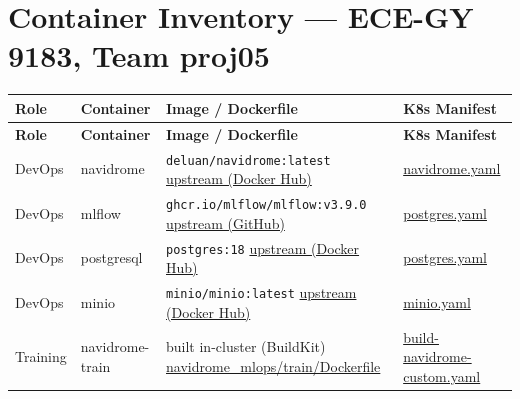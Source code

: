 \documentclass[11pt,a4paper]{article}
\begin{document}
\section*{Container Inventory --- ECE-GY 9183, Team proj05}

\footnotesize
\setlength{\tabcolsep}{5pt}

\begin{longtable}{@{} p{1.5cm} p{2.6cm} p{4.8cm} p{4.4cm} @{}}
\toprule
\textbf{Role} & \textbf{Container} & \textbf{Image / Dockerfile} & \textbf{K8s Manifest} \\
\midrule
\endfirsthead
\toprule
\textbf{Role} & \textbf{Container} & \textbf{Image / Dockerfile} & \textbf{K8s Manifest} \\
\midrule
\endhead
\bottomrule
\endlastfoot

DevOps &
navidrome &
\texttt{deluan/navidrome:latest} \newline
\href{https://hub.docker.com/r/deluan/navidrome}{upstream (Docker Hub)} &
\href{https://github.com/salawhaaat/navidrome-iac/blob/main/k8s/platform/templates/navidrome.yaml}{navidrome.yaml} \\[8pt]

DevOps &
mlflow &
\texttt{ghcr.io/mlflow/mlflow:v3.9.0} \newline
\href{https://github.com/mlflow/mlflow}{upstream (GitHub)} &
\href{https://github.com/salawhaaat/navidrome-iac/blob/main/k8s/platform/templates/postgres.yaml}{postgres.yaml} \\[8pt]

DevOps &
postgresql &
\texttt{postgres:18} \newline
\href{https://hub.docker.com/_/postgres}{upstream (Docker Hub)} &
\href{https://github.com/salawhaaat/navidrome-iac/blob/main/k8s/platform/templates/postgres.yaml}{postgres.yaml} \\[8pt]

DevOps &
minio &
\texttt{minio/minio:latest} \newline
\href{https://hub.docker.com/r/minio/minio}{upstream (Docker Hub)} &
\href{https://github.com/salawhaaat/navidrome-iac/blob/main/k8s/platform/templates/minio.yaml}{minio.yaml} \\[8pt]

Training &
navidrome-train &
built in-cluster (BuildKit) \newline
\href{https://github.com/yeshavyas27/navidrome_mlops/blob/master/train/Dockerfile}{navidrome\_mlops/train/Dockerfile} &
\href{https://github.com/salawhaaat/navidrome-iac/blob/main/workflows/build-navidrome-custom.yaml}{build-navidrome-custom.yaml} \\[8pt]


\end{longtable}
\end{document}
